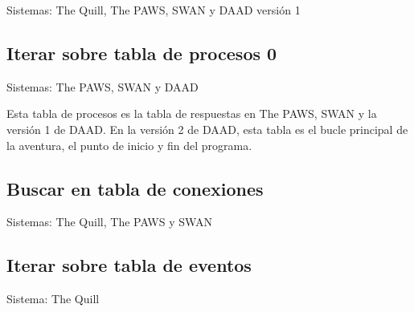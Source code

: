 \documentclass[11pt, a5paper]{article}
\newcommand{\quill}{\textsf{The Quill}\xspace}
\newcommand{\paw}{\textsf{The PAWS}\xspace}
\newcommand{\swan}{\textsf{SWAN}\xspace}
\newcommand{\daad}{\textsf{DAAD}\xspace}
\newcommand{\sistema}[1]{\noindent Sistema: #1 \nopagebreak}
\newcommand{\sistemas}[1]{\noindent Sistemas: #1 \nopagebreak}
\begin{document}
\sistemas{\quill, \paw, \swan y \daad versión 1}

\subsection{Iterar sobre tabla de procesos 0}

\sistemas{\paw, \swan y \daad}

Esta tabla de procesos es la tabla de respuestas en \paw, \swan y la versión 1 de \daad. En la versión 2 de \daad, esta tabla es el bucle principal de la aventura, el punto de inicio y fin del programa.

\subsection{Buscar en tabla de conexiones}

\sistemas{\quill, \paw y \swan}

\subsection{Iterar sobre tabla de eventos}

\sistema{\quill}
\end{document}

